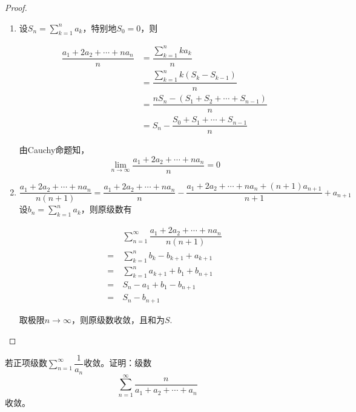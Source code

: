 \begin{proof}
    
    \begin{enumerate}
        
        \item 
            设$S_n = \sum\limits_{k  = 1}^{n}{a_k}$，特别地$S_0 = 0$，则

            \begin{align*}
                \dfrac{a_1 + 2a_2 + \cdots + na_n}{n} & = \dfrac{\sum\limits_{k  = 1}^{n}{ka_k}}{n} \\
                & = \dfrac{\sum\limits_{k  = 1}^{n}{k(S_k - S_{k - 1})}}{n} \\
                & = \dfrac{nS_n - (S_1 + S_2 + \cdots + S_{n - 1})}{n} \\
                & = S_n - \dfrac{S_0 + S_1 + \cdots + S_{n - 1}}{n}
            \end{align*}

            由\textup{Cauchy}命题知，
            \[\lim\limits_{n \to \infty}{\dfrac{a_1 + 2a_2 + \cdots + na_n}{n}} = 0\]

        \item 
            \[\dfrac{a_1 + 2a_2 + \cdots + na_n}{n(n + 1)} = \dfrac{a_1 + 2a_2 + \cdots + na_n}{n} - \dfrac{a_1 + 2a_2 + \cdots + na_n + (n + 1)a_{n + 1}}{n + 1} + a_{n + 1}\]
            设$b_n = \sum\limits_{k  = 1}^{n}{a_k}$，则原级数有

            \begin{align*}
                & \sum\limits_{n = 1}^{\infty}{\dfrac{a_1 + 2a_2 + \cdots + na_n}{n(n + 1)}} \\
                = \  & \sum\limits_{k  = 1}^{n}{b_k - b_{k + 1} + a_{k + 1}} \\
                = \  & \sum\limits_{k  = 1}^{n}{a_{k + 1} + b_1 + b_{n + 1}} \\
                = \  & S_n - a_1 + b_1 - b_{n + 1} \\
                = \  & S_n - b_{n + 1} 
            \end{align*}

            取极限$n \to \infty$，则原级数收敛，且和为$S$.

    \end{enumerate}

\end{proof}

\begin{proposition}
    
    若正项级数$\sum\limits_{n = 1}^{\infty}{\dfrac{1}{a_n}}$收敛。证明：级数
    \[\sum\limits_{n = 1}^{\infty}{\dfrac{n}{a_1 + a_2 + \cdots + a_n}}\]
    收敛。

\end{proposition}

